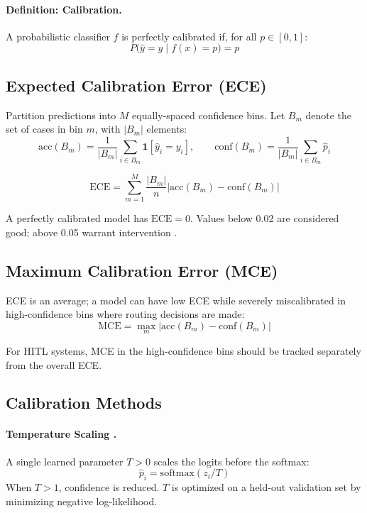 \paragraph{Definition: Calibration.} A probabilistic classifier $f$ is perfectly calibrated if, for all $p \in [0,1]$:
\[
P\bigl(\hat{y} = y \mid f(x) = p\bigr) = p
\]

\subsection{Expected Calibration Error (ECE)}

Partition predictions into $M$ equally-spaced confidence bins. Let $B_m$ denote the set of cases in bin $m$, with $|B_m|$ elements:
\[
\text{acc}(B_m) = \frac{1}{|B_m|} \sum_{i \in B_m} \mathbf{1}[\hat{y}_i = y_i], \qquad
\text{conf}(B_m) = \frac{1}{|B_m|} \sum_{i \in B_m} \hat{p}_i
\]

\[
\text{ECE} = \sum_{m=1}^{M} \frac{|B_m|}{n} \left| \text{acc}(B_m) - \text{conf}(B_m) \right|
\]

A perfectly calibrated model has $\text{ECE} = 0$. Values below 0.02 are considered good; above 0.05 warrant intervention \autocite{guo2017calibration}.

\subsection{Maximum Calibration Error (MCE)}

ECE is an average; a model can have low ECE while severely miscalibrated in high-confidence bins where routing decisions are made:
\[
\text{MCE} = \max_m \left| \text{acc}(B_m) - \text{conf}(B_m) \right|
\]

For HITL systems, MCE in the high-confidence bins should be tracked separately from the overall ECE.

\subsection{Calibration Methods}

\paragraph{Temperature Scaling \autocite{guo2017calibration}.}
A single learned parameter $T > 0$ scales the logits before the softmax:
\[
\hat{p}_i = \text{softmax}(z_i / T)
\]
When $T > 1$, confidence is reduced. $T$ is optimized on a held-out validation set by minimizing negative log-likelihood.

